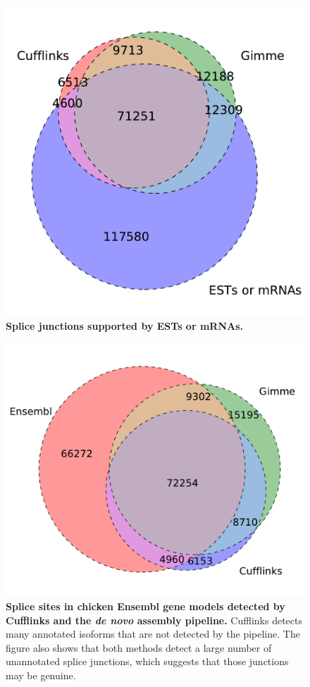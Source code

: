 \documentclass[10pt]{article}
\begin{document}
\begin{figure}[!ht]
\begin{center}
\includegraphics[width=5in]{chick_est_venn.pdf}
\end{center}
\caption{
    {\bf Splice junctions supported by ESTs or mRNAs.}
}
\label{chick_est_venn}
\end{figure}

\begin{figure}[!ht]
\begin{center}
\includegraphics[width=5in]{chick_venn.pdf}
\end{center}
\caption{
{\bf Splice sites in chicken Ensembl gene models detected by Cufflinks and the
{\em de novo} assembly pipeline.} Cufflinks detects many annotated isoforms
that are not detected by the pipeline.  The figure also shows that both methods
detect a large number of unannotated splice junctions, which suggests that those
junctions may be genuine.  }
\label{chick_venn}
\end{figure}
\end{document}
